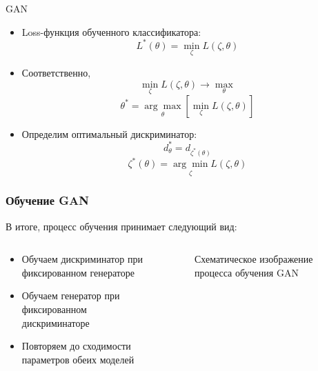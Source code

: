 \documentclass[9pt]{beamer}
\begin{document}
\begin{frame}{GAN}
	\begin{itemize}
		\item Loss-функция обученного классификатора:
		$$ L^*(\theta) = \underset{\zeta}{\min} L(\zeta, \theta) $$
		\item Соответственно,
		 $$ \underset{\zeta}{\min} L(\zeta, \theta) \longrightarrow \underset{\theta}{\max} $$
		 $$ \theta^* = \underset{\theta}{\arg\max} \left[ \underset{\zeta}{\min} L(\zeta, \theta) \right] $$
		 \item Определим оптимальный дискриминатор:
		 $$ d^*_{\theta} = d_{\zeta^*(\theta)} $$
		 $$ \zeta^*(\theta) =  \underset{\zeta}{\arg\min} L(\zeta, \theta)$$
	\end{itemize}
\end{frame}

\begin{frame}\frametitle{Обучение GAN}
	В итоге, процесс обучения принимает следующий вид:
	\begin{columns}
			\begin{center}
				\begin{itemize}
					\item Обучаем дискриминатор при фиксированном генераторе
					\item Обучаем генератор при фиксированном дискриминаторе
					\item Повторяем до сходимости параметров обеих моделей
				\end{itemize}
			\end{center}
			\begin{figure}
				\caption{Схематическое изображение процесса обучения GAN}
			\end{figure}
	\end{columns}
\end{frame}
\end{document}
